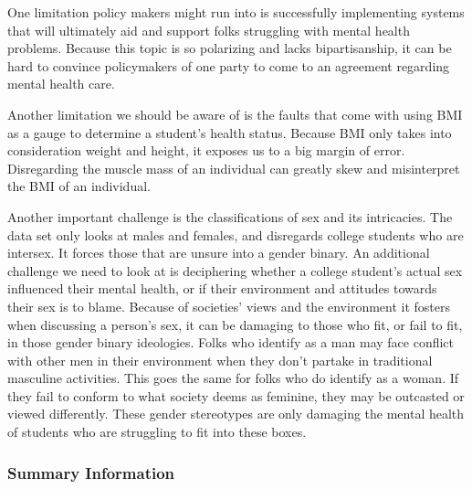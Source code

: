 \documentclass[
]{article}
\begin{document}
One limitation policy makers might run into is successfully implementing
systems that will ultimately aid and support folks struggling with
mental health problems. Because this topic is so polarizing and lacks
bipartisanship, it can be hard to convince policymakers of one party to
come to an agreement regarding mental health care.

Another limitation we should be aware of is the faults that come with
using BMI as a gauge to determine a student's health status. Because BMI
only takes into consideration weight and height, it exposes us to a big
margin of error. Disregarding the muscle mass of an individual can
greatly skew and misinterpret the BMI of an individual.

Another important challenge is the classifications of sex and its
intricacies. The data set only looks at males and females, and
disregards college students who are intersex. It forces those that are
unsure into a gender binary. An additional challenge we need to look at
is deciphering whether a college student's actual sex influenced their
mental health, or if their environment and attitudes towards their sex
is to blame. Because of societies' views and the environment it fosters
when discussing a person's sex, it can be damaging to those who fit, or
fail to fit, in those gender binary ideologies. Folks who identify as a
man may face conflict with other men in their environment when they
don't partake in traditional masculine activities. This goes the same
for folks who do identify as a woman. If they fail to conform to what
society deems as feminine, they may be outcasted or viewed differently.
These gender stereotypes are only damaging the mental health of students
who are struggling to fit into these boxes.

\hypertarget{summary-information}{%
\subsubsection{Summary Information}\label{summary-information}}
\end{document}
